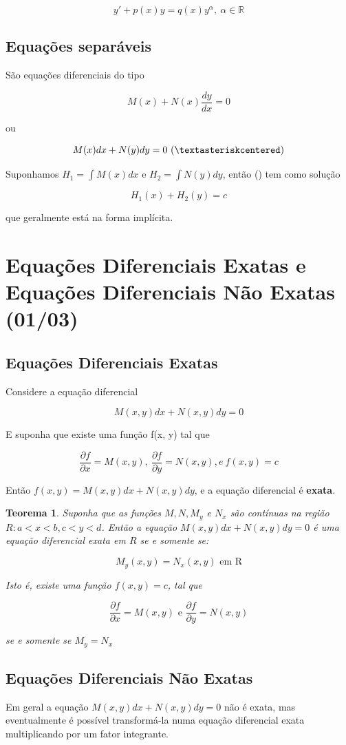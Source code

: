 \documentclass[12pt]{article}
\newtheorem{theorem}{Teorema}[section]
\begin{document}
$$y' + p(x) y = q(x) y^\alpha, \ \alpha \in \mathbb{R}$$

\subsection*{Equações separáveis}

São equações diferenciais do tipo

$$M(x) + N(x) \dfrac{d y}{d x} = 0$$

ou

$$M(x) d x + N(y) d y = 0 \ (\textasteriskcentered)$$

Suponhamos $H_1 = \int M(x) d x$ e $H_2 = \int N(y) d y$, então (\textasteriskcentered) tem como solução

$$H_1(x) + H_2 (y) = c$$

que geralmente está na forma implícita.

\section{Equações Diferenciais Exatas e Equações Diferenciais Não Exatas (01/03)}
\subsection*{Equações Diferenciais Exatas}
Considere a equação diferencial

$$M(x, y) d x + N(x, y) d y = 0$$

E suponha que existe uma função f(x, y) tal que 

$$\dfrac{\partial f}{\partial x} = M(x,y), \ \dfrac{\partial f}{\partial y} = N(x, y), e \ f(x, y) = c$$

Então $f(x, y) = M(x, y) d x + N(x, y) d y$, e a equação diferencial é \textbf{exata}.

\begin{theorem}
Suponha que as funções $M, N, M_y$ e $N_x$ são contínuas na região $R: a<x<b, c<y<d$. Então a equação $M(x, y) d x + N(x, y) d y = 0$ é uma equação diferencial exata em $R$ se e somente se:

$$M_y(x, y) = N_x(x, y) \text{ em R}$$

Isto é, existe uma função $f(x, y) = c$, tal que

$$\dfrac{\partial f}{\partial x} = M(x,y) \text{ e } \dfrac{\partial f}{\partial y} = N(x, y)$$

se e somente se $M_y = N_x$
\end{theorem}

\subsection*{Equações Diferenciais Não Exatas}
Em geral a equação $M(x, y) d x + N(x, y) d y = 0$ não é exata, mas eventualmente é possível transformá-la numa equação diferencial exata multiplicando por um fator integrante.
\end{document}
